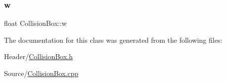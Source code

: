 \subsubsection{\texorpdfstring{w}{w}}
{\footnotesize\ttfamily float Collision\+Box\+::w}



The documentation for this class was generated from the following files\+:\begin{DoxyCompactItemize}
\item 
Header/\mbox{\hyperlink{_collision_box_8h}{Collision\+Box.\+h}}\item 
Source/\mbox{\hyperlink{_collision_box_8cpp}{Collision\+Box.\+cpp}}\end{DoxyCompactItemize}
